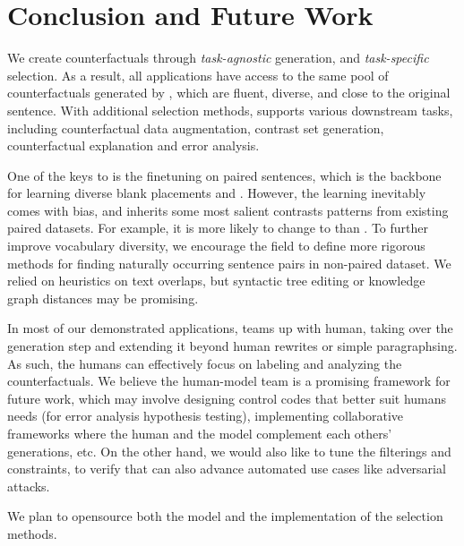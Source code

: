 \section{Conclusion and Future Work}
\label{sec:discuss}

We create counterfactuals through \emph{task-agnostic} generation, and \emph{task-specific} selection.
As a result, all applications have access to the same pool of counterfactuals generated by \sysname, which are fluent, diverse, and close to the original sentence.
With additional selection methods, \sysname supports various downstream tasks, including counterfactual data augmentation, contrast set generation, counterfactual explanation and error analysis.

One of the keys to \sysname is the finetuning on paired sentences, which is the backbone for learning diverse blank placements and \tagstrs.
However, the learning inevitably comes with bias, and \sysname inherits some most salient contrasts patterns from existing paired datasets.
For example, it is more likely to change  to  than .
To further improve vocabulary diversity, we encourage the field to define more rigorous methods for finding naturally occurring sentence pairs in non-paired dataset.
We relied on heuristics on text overlaps, but syntactic tree editing or knowledge graph distances may be promising.


In most of our demonstrated applications, \sysname teams up with human, taking over the generation step and extending it beyond human rewrites or simple paragraphsing. 
As such, the humans can effectively focus on labeling and analyzing the counterfactuals.
We believe the human-model team is a promising framework for future work, which may involve designing control codes that better suit humans needs (\eg for error analysis hypothesis testing), implementing collaborative frameworks where the human and the model complement each others' generations, etc.
On the other hand, we would also like to tune the filterings and constraints, to verify that \sysname can also advance automated use cases like adversarial attacks.

We plan to opensource both the \sysname model and the implementation of the selection methods.




